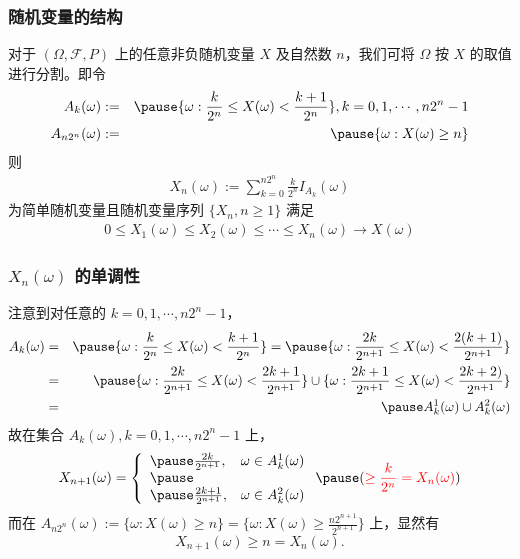 \documentclass[Prob-All.tex]{subfiles}
\begin{document}
\begin{frame}
	\frametitle{随机变量的结构}
	对于 $(\Omega,\mathcal{F},P)$ 上的任意非负随机变量 $X$ 及自然数 $n$，我们可将 $\Omega$ 按 $X$ 的取值进行分割。即令
	\begin{eqnarray*}
		A_k(\omega)&:=&\pause \{\omega:\frac{k}{2^n}\le X(\omega)<\frac{k+1}{2^n}\}, k=0,1,\cdots, n2^n-1\\
		A_{n2^n}(\omega)&:=&\pause \{\omega:X(\omega)\ge n\}
	\end{eqnarray*}
	\pause 则
	\begin{eqnarray*}
		X_n(\omega):=\sum_{k=0}^{n2^n}\frac{k}{2^n}I_{A_k}(\omega)
	\end{eqnarray*}
	为简单随机变量且随机变量序列 $\{X_n,n\ge 1\}$ 满足
	\begin{eqnarray*}
		0\le X_1(\omega)\le X_2(\omega)\le \cdots\le X_n(\omega)\rightarrow X(\omega)
	\end{eqnarray*}
\end{frame}
\begin{frame}
	\frametitle{$X_n (\omega)$ 的单调性}
	注意到对任意的 $k=0,1,\cdots,n2^n-1$，
	\begin{eqnarray*}
		A_k(\omega)&=&\pause \{\omega:\frac{k}{2^n}\le X(\omega)<\frac{k+1}{2^n}\}=\pause \{\omega:\frac{2k}{2^{n+1}}\le X(\omega)<\frac{2(k+1)}{2^{n+1}}\}\\
		&=&\pause \{\omega:\frac{2k}{2^{n+1}}\le X(\omega)<\frac{2k+1}{2^{n+1}}\}\cup \{\omega:\frac{2k+1}{2^{n+1}}\le X(\omega)<\frac{2k+2)}{2^{n+1}}\}\\
		&=&\pause A_k^1(\omega)\cup A_k^2(\omega)
	\end{eqnarray*}
	\pause 故在集合 $A_k (\omega),k=0,1,\cdots,n2^n-1$ 上，\pause
	\begin{eqnarray*}
		X_{n+1}(\omega)=
		\left\{\begin{array}{ll}
			\pause  \frac{2k}{2^{n+1}},   & \omega\in A_k^1(\omega)  \\ \pause
			                              &                          \\
			\pause  \frac{2k+1}{2^{n+1}}, & \omega\in A_k^2(\omega)
		\end{array}
		\right.\pause  (\textcolor{red}{\ge \frac{k}{2^n}=X_n(\omega)})
	\end{eqnarray*}
	\pause
	而在 $A_{n2^n}(\omega):=\{\omega:X (\omega)\ge n\}=\{\omega:X (\omega)\ge \frac{n2^{n+1}}{2^{n+1}}\}$ 上，显然有
	\pause $$X_{n+1}(\omega)\ge n=X_n(\omega).$$
\end{frame}
\end{document}
